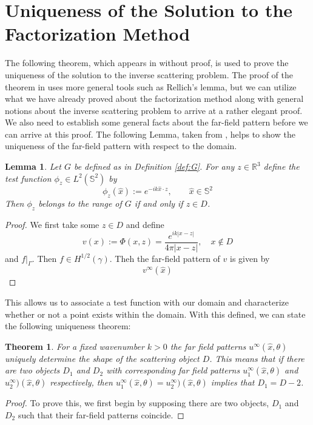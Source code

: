 \documentclass[]{article}
\newtheorem{theorem}{Theorem}
\newtheorem{lemma}{Lemma}
\newcommand{\R}{\mathbb R}
\renewcommand{\S}{\mathbb S}
\begin{document}
		\section{Uniqueness of the Solution to the Factorization Method}
			The following theorem, which appears in \cite{kirschgrinberg2008} without proof, is used to prove the uniqueness of the solution to the inverse scattering problem. The proof of the theorem in \cite{coltonkress2013} uses more general tools such as Rellich's lemma, but we can utilize what we have already proved about the factorization method along with general notions about the inverse scattering problem to arrive at a rather elegant proof. We also need to establish some general facts about the far-field pattern before we can arrive at this proof. The following Lemma, taken from \cite{kirschgrinberg2008}, helps to show the uniqueness of the far-field pattern with respect to the domain.
			\begin{lemma}
				\label{lemma:test-function}
				Let $G$ be defined as in Definition \ref{def:G}. For any $z\in \R^3$ define the test function $\phi_z \in L^2(\S^2)$ by 
				\begin{equation}
					\phi_z(\hat x) := e^{-ik\hat x\cdot z}, \qquad \hat x\in \S^2
				\end{equation}
				Then $\phi_z$ belongs to the range of $G$ if and only if $z\in D$.
			\end{lemma}
			\begin{proof}
				We first take some $z\in D$ and define
				\begin{equation}
					v(x) := \Phi(x, z) = \frac{e^{ik|x-z|}}{4\pi |x-z|}, \quad x\notin D
				\end{equation}
				and $f|_\Gamma$. Then $f \in H^{1/2}(\gamma)$. Theh the far-field pattern of $v$ is given by 
				\begin{equation}
					v^\infty(\hat x)
				\end{equation}
			\end{proof}
			This allows us to associate a test function with our domain and characterize whether or not a point exists within the domain. With this defined, we can state the following uniqueness theorem:
			\begin{theorem}
				\label{theorem:uniqueness}
				For a fixed wavenumber $k>0$ the far field patterns $u^\infty(\hat x, \theta)$ uniquely determine the shape of the scattering object $D$. This means that if there are two objects $D_1$ and $D_2$ with corresponding far field patterns $u_1^\infty(\hat x, \theta)$ and $u_2^\infty)(\hat x, \theta)$ respectively, then $u_1^\infty(\hat x, \theta)=u_2^\infty)(\hat x, \theta)$ implies that $D_1=D-2$.
			\end{theorem}
			\begin{proof}
				To prove this, we first begin by supposing there are two objects, $D_1$ and $D_2$ such that their far-field patterns coincide. 
			\end{proof}
\end{document}
